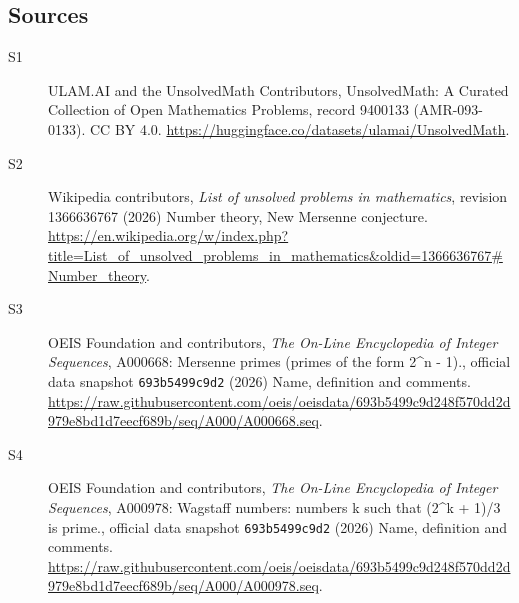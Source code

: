 \documentclass[11pt]{article}
\begin{document}
\subsection{Sources}
\begin{description}
\item[\hypertarget{source:9400133:1}{S1}] ULAM.AI and the UnsolvedMath Contributors, UnsolvedMath: A Curated Collection of Open Mathematics Problems, record 9400133 (AMR-093-0133). CC BY 4.0. \url{https://huggingface.co/datasets/ulamai/UnsolvedMath}.
\item[\hypertarget{source:9400133:2}{S2}] Wikipedia contributors, \emph{List of unsolved problems in mathematics}, revision 1366636767 (2026) Number theory, New Mersenne conjecture. \url{https://en.wikipedia.org/w/index.php?title=List_of_unsolved_problems_in_mathematics&oldid=1366636767#Number_theory}.
\item[\hypertarget{source:9400133:3}{S3}] OEIS Foundation and contributors, \emph{The On-Line Encyclopedia of Integer Sequences}, A000668: Mersenne primes (primes of the form 2\textasciicircum{}n - 1)., official data snapshot \texttt{693b5499c9d2} (2026) Name, definition and comments. \url{https://raw.githubusercontent.com/oeis/oeisdata/693b5499c9d248f570dd2d979e8bd1d7eecf689b/seq/A000/A000668.seq}.
\item[\hypertarget{source:9400133:4}{S4}] OEIS Foundation and contributors, \emph{The On-Line Encyclopedia of Integer Sequences}, A000978: Wagstaff numbers: numbers k such that (2\textasciicircum{}k + 1)/3 is prime., official data snapshot \texttt{693b5499c9d2} (2026) Name, definition and comments. \url{https://raw.githubusercontent.com/oeis/oeisdata/693b5499c9d248f570dd2d979e8bd1d7eecf689b/seq/A000/A000978.seq}.
\end{description}
\label{end:9400133}
\end{document}
